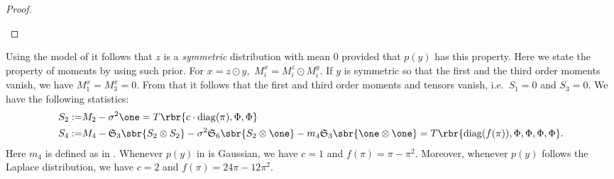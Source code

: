 \documentclass[twoside,11pt]{article}
\newcommand{\symm}{\mathfrak{S}}
\begin{document}
{\begin{proof}
\begin{description*}
\end{description*}

\end{proof}

%

Using the model of  it follows that $z$ is a
\emph{symmetric} distribution with mean $0$ provided that $p(y)$ has
this property. 
Here we state the property of moments by using such prior. For $x = z \odot y,$ 
$M_i^x = M_i^z \odot M_i^y.$ If $y$ is symmetric so that the first and the third 
order moments vanish, we have $M_1^x = M_3^x = 0.$ From that it follows that 
the first and third order
moments and tensors vanish, i.e.\ $S_1=0$ and $S_3=0$. We have the
following statistics:
\begin{align}
  \label{eq:isfa-tensor-1}
  S_2 := &  M_2 -\sigma^2 \one = T\rbr{c \cdot \mathrm{diag}(\pi), \Phi, \Phi}\\
  \label{eq:isfa-tensor-4}
  S_4 := & M_4 -\symm_3 \sbr{S_2 \otimes S_2} - 
  \sigma^2\symm_6 \sbr{S_2 \otimes \one} - m_4 \symm_3 \sbr{\one \otimes \one}
  = T\rbr{\mathrm{diag}(f(\pi)), \Phi, \Phi, \Phi, \Phi}.
\end{align}
Here $m_4$ is defined as in . Whenever $p(y)$ in
 is Gaussian, we have $c = 1$ and $f(\pi) = \pi -
\pi^2$. Moreover, whenever $p(y)$ follows the Laplace distribution, we
have $c=2$ and $f(\pi) = 24 \pi - 12 \pi^2$.

}
\end{document}
